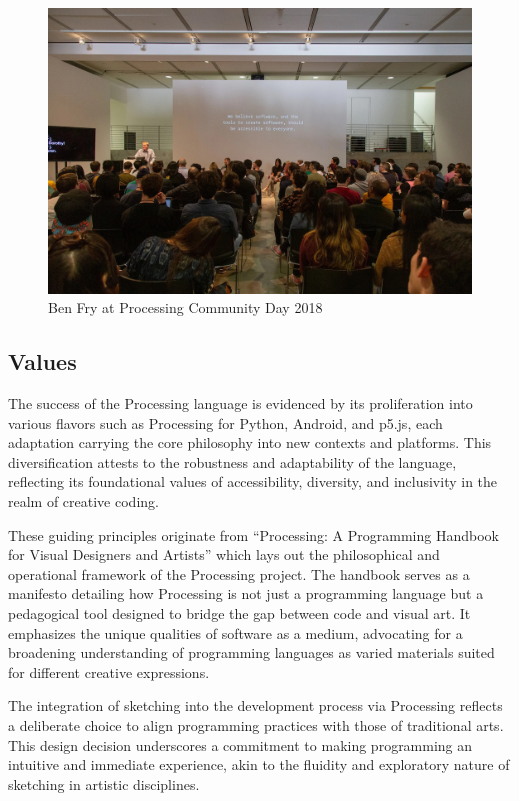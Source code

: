   \newpage 

  \begin{figure}[h]
    \centering
    \includegraphics[width=1\textwidth]{images/pcd_la_2019.jpeg}
    \caption[Ben Fry at PCD 2018]{Ben Fry at Processing Community Day 2018}
  \end{figure}
  
\subsection{Values}

The success of the Processing language is evidenced by its proliferation into various flavors such as Processing for Python, Android, and p5.js, each adaptation carrying the core philosophy into new contexts and platforms. This diversification attests to the robustness and adaptability of the language, reflecting its foundational values of accessibility, diversity, and inclusivity in the realm of creative coding.

These guiding principles originate from \enquote{Processing: A Programming Handbook for Visual Designers and Artists} \parencite{reasProcessingProgrammingHandbook2007a} which lays out the philosophical and operational framework of the Processing project. The handbook serves as a manifesto detailing how Processing is not just a programming language but a pedagogical tool designed to bridge the gap between code and visual art. It emphasizes the unique qualities of software as a medium, advocating for a broadening understanding of programming languages as varied materials suited for different creative expressions.

The integration of sketching into the development process via Processing reflects a deliberate choice to align programming practices with those of traditional arts. This design decision underscores a commitment to making programming an intuitive and immediate experience, akin to the fluidity and exploratory nature of sketching in artistic disciplines.

